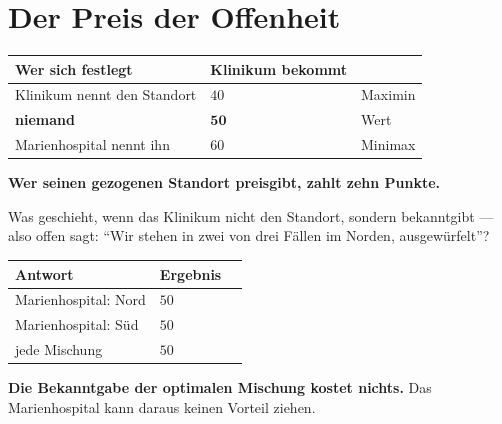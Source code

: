 \section{Der Preis der Offenheit}

\begin{merksatz}
\begin{center}
{\small
\renewcommand{\arraystretch}{1.52}
\begin{tabular}{@{}P{3.0cm}P{2.0cm}P{3.2cm}@{}}
\toprule
\textbf{Wer sich festlegt} & \textbf{Klinikum bekommt} & \\
\midrule
Klinikum nennt den Standort & $40$ & Maximin\\
\textbf{niemand} & $\mathbf{50}$ & Wert\\
Marienhospital nennt ihn & $60$ & Minimax\\
\bottomrule
\end{tabular}}
\end{center}

\begin{center}
\begin{minipage}{0.9\textwidth}
\textbf{Wer seinen gezogenen Standort preisgibt, zahlt zehn Punkte.}
\end{minipage}
\end{center}

Was geschieht, wenn das Klinikum nicht den Standort, sondern  bekanntgibt --- also offen sagt: \enquote{Wir stehen in zwei von drei Fällen im Norden, ausgewürfelt}?

\begin{center}
\renewcommand{\arraystretch}{1.5}
\begin{tabular}{@{}P{3.2cm}P{2.0cm}P{2.4cm}@{}}
\toprule
\textbf{Antwort} & \textbf{Ergebnis} & \\
\midrule
Marienhospital: Nord & $50$ & \\
Marienhospital: Süd & $50$ & \\
jede Mischung & $50$ & \\
\bottomrule
\end{tabular}
\end{center}

\begin{center}
\begin{minipage}{0.9\textwidth}
\textbf{Die Bekanntgabe der optimalen Mischung kostet nichts.} Das Marienhospital kann daraus keinen Vorteil ziehen.
\end{minipage}
\end{center}


\end{merksatz}
